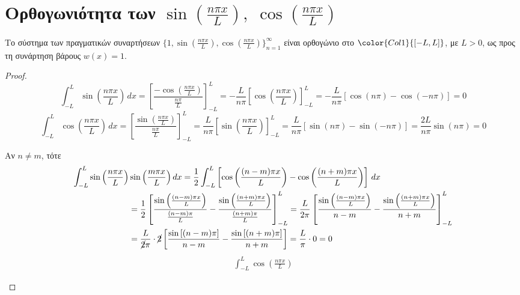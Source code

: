 \section*{Ορθογωνιότητα των \ensuremath{\sin{(\frac{n \pi x}{L})}, \; 
\cos{(\frac{n \pi x}{L})}}}

\begin{prop}
  Το σύστημα των πραγματικών συναρτήσεων 
  $ \{ 1, \sin{(\frac{n \pi x}{L})}, \cos{(\frac{n \pi x}{L})} \}_{n=1}^{\infty} $ 
  είναι ορθογώνιο στο $ \color{Col1}{[-L,L]} $, με $ L>0 $, ως προς τη συνάρτηση 
  βάρους $ w(x)=1 $.
\end{prop}
\begin{proof}
  \[
    \int _{-L}^{L} \sin{\left(\frac{n \pi x}{L}\right)} \,{dx} =  
    \left[\frac{- \cos{\left(\frac{n \pi x}{L}\right)}}{\frac{n \pi }{L}} 
    \right]_{-L}^{L}
    = - \frac{L}{n \pi} \left[\cos{\left(\frac{n \pi x}{L}\right)} \right]_{-L}^{L} 
    = -\frac{L}{n \pi} [ \cos{(n \pi)} - \cos{(- n \pi)}]  
    = 0 
  \] 
  \[
    \int _{-L}^{L} \cos{\left(\frac{n \pi x}{L}\right)} \,{dx} =  
    \left[\frac{\sin{\left(\frac{n \pi x}{L}\right)}}{\frac{n \pi }{L}} \right]_{-L}^{L} 
    = \frac{L}{n \pi} \left[\sin{\left(\frac{n \pi x}{L}\right)} \right]_{-L}^{L} = 
    \frac{L}{n \pi} [ \sin{(n \pi)} - \sin{(- n \pi)}] =  \frac{2L}{n \pi } 
    \sin{(n \pi)} = 0 
  \]
  \begin{myitemize}
    \item Αν $ n \neq m $, τότε
      \begin{align*}
        \int _{-L}^{L} \sin{\left(\frac{n \pi x }{L}\right)} 
        &\sin{\left(\frac{m \pi x}{L}\right)} \,{dx} 
        = \frac{1}{2} \int _{-L}^{L} \left[\cos{\left(\frac{(n-m) \pi x}{L}\right)} 
        - \cos{\left(\frac{(n+m) \pi x}{L}\right)} \right] \,{dx} \\
        &= \frac{1}{2} \left[\frac{\sin{\left(\frac{(n-m) \pi x}{L}\right)}}
          {\frac{(n-m) \pi}{L}} - \frac{\sin{\left(\frac{(n+m) \pi x}{L}\right)}}
        {\frac{(n+m) \pi }{L}}\right]_{-L}^{L} 
        = \frac{L}{2 \pi} \left[\frac{\sin{\left(\frac{(n-m) \pi
          x}{L}\right)}}{n-m} - 
        \frac{\sin{\left(\frac{(n+m) \pi x}{L}\right)}}{n+m}\right]_{-L}^{L} \\ 
        &= \frac{L}{\cancel{2}\pi} \cdot \cancel{2}
        \left[ \frac{\sin{[(n-m) \pi]}}{n-m} - \frac{\sin{[(n+m)
        \pi]}}{n+m}\right] = \frac{L}{\pi} \cdot 0 = 0
      \end{align*} 
      \begin{align*}
        \int _{-L}^{L} \cos{\left(\frac{n \pi x }{L}\right)} 

\end{align*}
\end{myitemize}
\end{proof}
